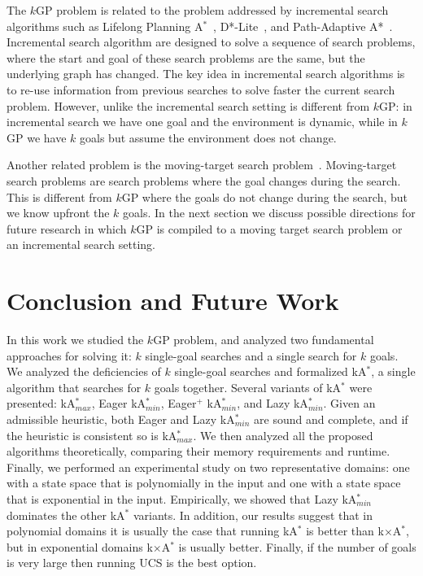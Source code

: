 \documentclass{aicom2e}
\newcommand{\kgs}{$k$GP}
\newcommand{\astar}{A$^*$}
\newcommand{\kastar}{kA$^*$}
\newcommand{\kastarmin}{kA$^*_{min}$}
\newcommand{\kastarmax}{kA$^*_{max}$}
\newcommand{\kxastar}{k$\times$A$^*$}
\begin{document}
The \kgs{} problem is related to the problem addressed by incremental search
algorithms such as Lifelong Planning \astar{}~\cite{koenig2004lifelong},
D*-Lite~\cite{koenig2005fast}, and Path-Adaptive
A*~\cite{hernandez2015reusing}. Incremental search algorithm are designed to
solve a sequence of search problems, where the start and goal of these search
problems are the same, but the underlying graph has changed. The key idea in
incremental search algorithms is to re-use information from previous searches
to solve faster the current search problem. However, unlike the incremental
search setting is different from \kgs{}: in incremental search we have one goal
and the environment is dynamic, while in \kgs{} we have $k$ goals but assume
the environment does not change.

Another related problem is the moving-target search
problem~\cite{koenig2007speeding,ishida1991moving}. Moving-target search
problems are search problems where the goal changes during the search. This is
different from \kgs{} where the goals do not change during the search, but we
know upfront the $k$ goals. In the next section we discuss possible directions
for future research in which \kgs{} is compiled to a moving target
search problem or an incremental search setting. %


\section{Conclusion and Future Work}

In this work we studied the \kgs{} problem, and analyzed two fundamental
approaches for solving it: $k$ single-goal searches and a single search for $k$
goals. We analyzed the deficiencies of $k$ single-goal searches and formalized
\kastar{}, a single algorithm that searches for $k$ goals together. Several
variants of \kastar{} were presented: \kastarmax{}, Eager \kastarmin{},
Eager$^+$ \kastarmin{}, and Lazy \kastarmin{}. Given an admissible heuristic,
both Eager and Lazy \kastarmin{} are sound and complete, and if the heuristic
is consistent so is \kastarmax{}. We then analyzed all the proposed algorithms
theoretically, comparing their memory requirements and runtime. Finally, we
performed an experimental study on two representative domains: one with a state
space that is polynomially in the input and one with a state space that is
exponential in the input. Empirically, we showed that Lazy \kastarmin{}
dominates the other \kastar{} variants. In addition, our results suggest that
in polynomial domains it is usually the case that running \kastar{} is better
than \kxastar{}, but in exponential domains \kxastar{} is usually better.
Finally, if the number of goals is very large then running UCS is the best
option.
\end{document}
